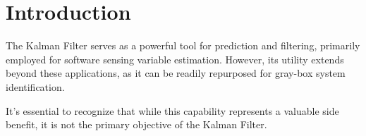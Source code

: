 \section{Introduction}

The Kalman Filter serves as a powerful tool for prediction and filtering, primarily employed for software sensing variable estimation. 
However, its utility extends beyond these applications, as it can be readily repurposed for gray-box system identification.

It's essential to recognize that while this capability represents a valuable side benefit, it is not the primary objective of the Kalman Filter.